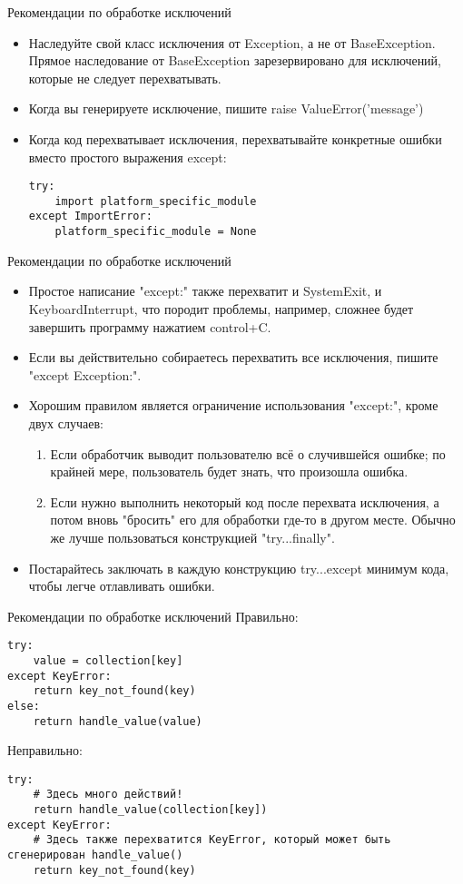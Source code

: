 \documentclass[xcolor=table]{beamer}
\begin{document}
\begin{frame}[fragile]{Рекомендации по обработке исключений}
	\begin{itemize}
		\item Наследуйте свой класс исключения от Exception, а не от BaseException. Прямое наследование от BaseException зарезервировано для исключений, которые не следует перехватывать.
		\item Когда вы генерируете исключение, пишите raise ValueError('message')
		\item Когда код перехватывает исключения, перехватывайте конкретные ошибки вместо простого выражения except:	
		\begin{verbatim}
try:
    import platform_specific_module
except ImportError:
    platform_specific_module = None
		\end{verbatim}
	\end{itemize}			
\end{frame}

\begin{frame}[fragile]{Рекомендации по обработке исключений}
	\begin{itemize}
		\item Простое написание "except:" также перехватит и SystemExit, и KeyboardInterrupt, что породит проблемы, например, сложнее будет завершить программу нажатием control+C. 
		\item Если вы действительно собираетесь перехватить все исключения, пишите "except Exception:".
		\item Хорошим правилом является ограничение использования "except:", кроме двух случаев:
		\begin{enumerate}
			\item Если обработчик выводит пользователю всё о случившейся ошибке; по крайней мере, пользователь будет знать, что произошла ошибка.
			\item Если нужно выполнить некоторый код после перехвата исключения, а потом вновь "бросить" его для обработки где-то в другом месте. Обычно же лучше пользоваться конструкцией "try...finally".		
		\end{enumerate}
		\item Постарайтесь заключать в каждую конструкцию try...except минимум кода, чтобы легче отлавливать ошибки.
	\end{itemize}			
\end{frame}

\begin{frame}[fragile]{Рекомендации по обработке исключений}
	Правильно:
	\begin{verbatim}
try:
    value = collection[key]
except KeyError:
    return key_not_found(key)
else:
    return handle_value(value)		
	\end{verbatim}
	Неправильно:
	\begin{verbatim}
try:
    # Здесь много действий!
    return handle_value(collection[key])
except KeyError:
    # Здесь также перехватится KeyError, который может быть сгенерирован handle_value()
    return key_not_found(key)		
	\end{verbatim}
\end{frame}
\end{document}
